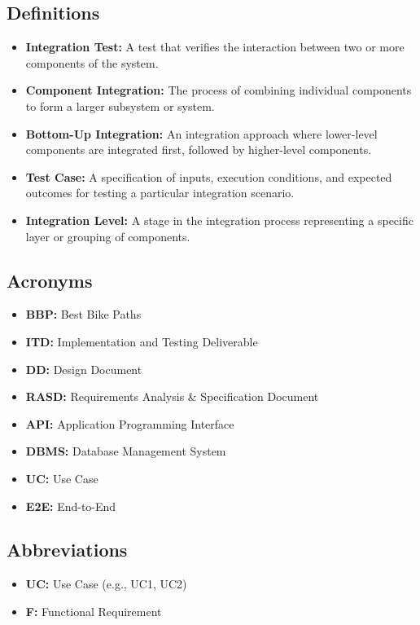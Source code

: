 \subsection{Definitions}
\label{subsec:definitions}%
\begin{itemize}
    \item \textbf{Integration Test:} A test that verifies the interaction between two or more components of the system.
    \item \textbf{Component Integration:} The process of combining individual components to form a larger subsystem or system.
    \item \textbf{Bottom-Up Integration:} An integration approach where lower-level components are integrated first, followed by higher-level components.
    \item \textbf{Test Case:} A specification of inputs, execution conditions, and expected outcomes for testing a particular integration scenario.
    \item \textbf{Integration Level:} A stage in the integration process representing a specific layer or grouping of components.
\end{itemize}

\subsection{Acronyms}
\label{subsec:acronyms}%
\begin{itemize}
    \item \textbf{BBP:} Best Bike Paths
    \item \textbf{ITD:} Implementation and Testing Deliverable
    \item \textbf{DD:} Design Document
    \item \textbf{RASD:} Requirements Analysis \& Specification Document
    \item \textbf{API:} Application Programming Interface
    \item \textbf{DBMS:} Database Management System
    \item \textbf{UC:} Use Case
    \item \textbf{E2E:} End-to-End
\end{itemize}

\subsection{Abbreviations}
\label{subsec:abbreviations}%
\begin{itemize}
    \item \textbf{UC:} Use Case (e.g., UC1, UC2)
    \item \textbf{F:} Functional Requirement
\end{itemize}

